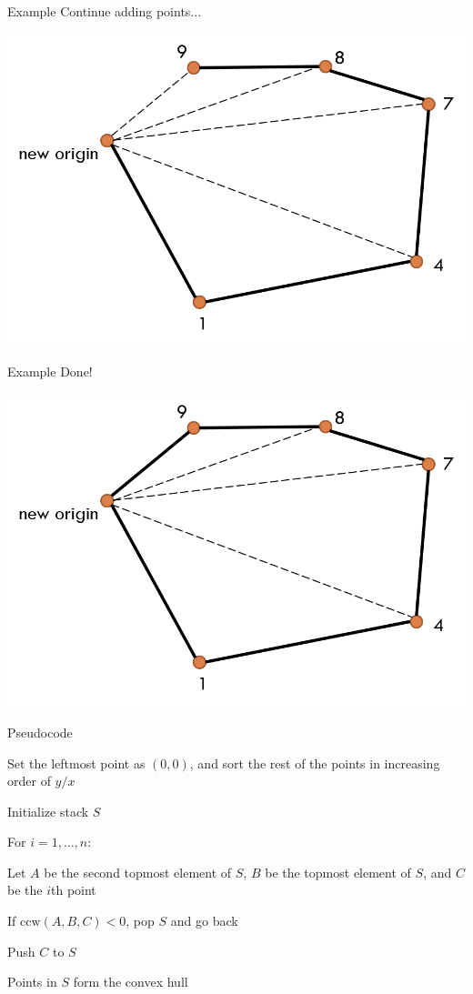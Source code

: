 \documentclass[13pt,onlymath]{beamer}
\begin{document}
\begin{frame}{Example}
Continue adding points...
\begin{center}
\includegraphics[height=0.5\textheight]{figures/graham13}
\end{center}
\end{frame}

\begin{frame}{Example}
Done!
\begin{center}
\includegraphics[height=0.5\textheight]{figures/graham14}
\end{center}
\end{frame}

\begin{frame}{Pseudocode}
\BIT
\item Set the leftmost point as $(0, 0)$, and sort the rest of the points in increasing order of $y/x$
\item Initialize stack $S$
\item For $i=1, \ldots, n$:
\BIT
\item Let $A$ be the second topmost element of $S$, $B$ be the topmost element of $S$, and $C$ be the $i$th point
\item If $\mathrm{ccw}(A, B, C) < 0$, pop $S$ and go back
\item Push $C$ to $S$
\EIT
\item Points in $S$ form the convex hull
\EIT
\end{frame}
\end{document}
